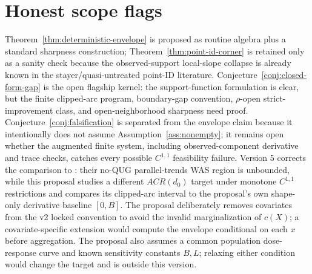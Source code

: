 \documentclass[11pt]{article}
\theoremstyle{definition}
\theoremstyle{plain}
\theoremstyle{remark}
\begin{document}
\section{Honest scope flags}
Theorem~\ref{thm:deterministic-envelope} is proposed as routine algebra plus a standard sharpness construction; Theorem~\ref{thm:point-id-corner} is retained only as a sanity check because the observed-support local-slope collapse is already known in the stayer/quasi-untreated point-ID literature.  Conjecture~\ref{conj:closed-form-gap} is the open flagship kernel: the support-function formulation is clear, but the finite clipped-arc program, boundary-gap convention, \(\rho\)-open strict-improvement class, and open-neighborhood sharpness need proof.  Conjecture~\ref{conj:falsification} is separated from the envelope claim because it intentionally does not assume Assumption~\ref{ass:nonempty}; it remains open whether the augmented finite system, including observed-component derivative and trace checks, catches every possible \(C^{1,1}\) feasibility failure.  Version 5 corrects the comparison to \citet{DCDHK2026NoUntreated}: their no-QUG parallel-trends WAS region is unbounded, while this proposal studies a different \(ACR(d_0)\) target under monotone \(C^{1,1}\) restrictions and compares its clipped-arc interval to the proposal's own shape-only derivative baseline \([0,B]\).  The proposal deliberately removes covariates from the v2 locked convention to avoid the invalid marginalization of \(c(X)\); a covariate-specific extension would compute the envelope conditional on each \(x\) before aggregation.  The proposal also assumes a common population dose-response curve and known sensitivity constants \(B,L\); relaxing either condition would change the target and is outside this version.
\end{document}
